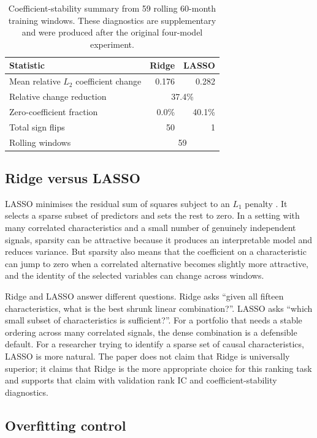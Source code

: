 \documentclass[11pt,a4paper]{article}
\begin{document}
\begin{table}[H]
\centering
\small
\begin{tabular}{lrr}
\toprule
Statistic & Ridge & LASSO \\
\midrule
Mean relative $L_2$ coefficient change & 0.176 & 0.282 \\
Relative change reduction & \multicolumn{2}{c}{37.4\%} \\
Zero-coefficient fraction & 0.0\% & 40.1\% \\
Total sign flips & 50 & 1 \\
Rolling windows & \multicolumn{2}{c}{59} \\
\bottomrule
\end{tabular}
\caption{Coefficient-stability summary from 59 rolling 60-month training windows. These diagnostics are supplementary and were produced after the original four-model experiment.}
\label{tab:stability}
\end{table}

\subsection{Ridge versus LASSO}

LASSO minimises the residual sum of squares subject to an $L_1$ penalty \citep{tibshirani1996}. It selects a sparse subset of predictors and sets the rest to zero. In a setting with many correlated characteristics and a small number of genuinely independent signals, sparsity can be attractive because it produces an interpretable model and reduces variance. But sparsity also means that the coefficient on a characteristic can jump to zero when a correlated alternative becomes slightly more attractive, and the identity of the selected variables can change across windows.

Ridge and LASSO answer different questions. Ridge asks ``given all fifteen characteristics, what is the best shrunk linear combination?''. LASSO asks ``which small subset of characteristics is sufficient?''. For a portfolio that needs a stable ordering across many correlated signals, the dense combination is a defensible default. For a researcher trying to identify a sparse set of causal characteristics, LASSO is more natural. The paper does not claim that Ridge is universally superior; it claims that Ridge is the more appropriate choice for this ranking task and supports that claim with validation rank IC and coefficient-stability diagnostics.

\subsection{Overfitting control}
\end{document}
